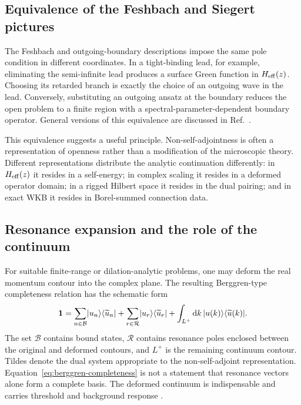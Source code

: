 \subsection{Equivalence of the Feshbach and Siegert pictures}
\label{subsec:feshbach-siegert}

The Feshbach and outgoing-boundary descriptions impose the same pole
condition in different coordinates.  In a tight-binding lead, for example,
eliminating the semi-infinite lead produces a surface Green function in
$H_{\mathrm{eff}}(z)$.  Choosing its retarded branch is exactly the choice of
an outgoing wave in the lead.  Conversely, substituting an outgoing ansatz at
the boundary reduces the open problem to a finite region with a
spectral-parameter-dependent boundary operator.  General versions of this
equivalence are discussed in Ref.~\cite{Hatano:2013nyz}.

This equivalence suggests a useful principle.  Non-self-adjointness is often a
representation of openness rather than a modification of the microscopic
theory.  Different representations distribute the analytic continuation
differently: in $H_{\mathrm{eff}}(z)$ it resides in a self-energy; in complex
scaling it resides in a deformed operator domain; in a rigged Hilbert space it
resides in the dual pairing; and in exact WKB it resides in Borel-summed
connection data.

\subsection{Resonance expansion and the role of the continuum}
\label{subsec:berggren-expansion}

For suitable finite-range or dilation-analytic problems, one may deform the
real momentum contour into the complex plane.  The resulting Berggren-type
completeness relation has the schematic form
\begin{equation}
  \mathbf{1}
  =\sum_{n\in\mathcal B}\lvert u_n \rangle\langle \widetilde u_n \rvert
  +\sum_{r\in\mathcal R}\lvert u_r \rangle\langle \widetilde u_r \rvert
  +\int_{L^+}\mathrm{d} k\,
  \lvert u(k) \rangle\langle \widetilde u(k) \rvert .
  \label{eq:berggren-completeness}
\end{equation}
The set $\mathcal B$ contains bound states, $\mathcal R$ contains resonance
poles enclosed between the original and deformed contours, and $L^+$ is the
remaining continuum contour.  Tildes denote the dual system appropriate to
the non-self-adjoint representation.  Equation~\eqref{eq:berggren-completeness}
is not a statement that resonance vectors alone form a complete basis.  The
deformed continuum is indispensable and carries threshold and background
response
\cite{Berggren:1968zz,Michel:2009,Myo:2014ypa}.

